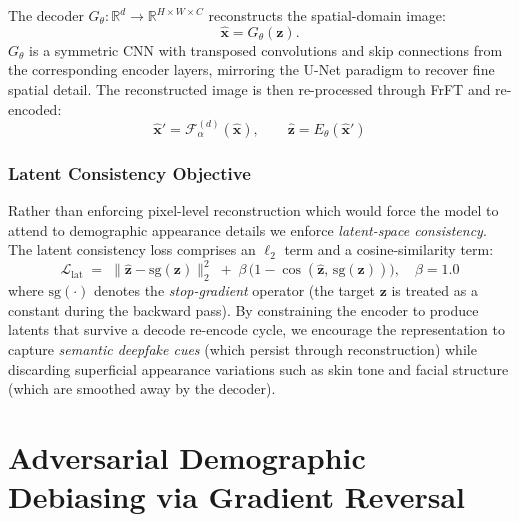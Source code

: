 The decoder $G_\theta : \mathbb{R}^d \to
\mathbb{R}^{H \times W \times C}$ reconstructs the spatial-domain
image:
\begin{equation}
  \hat{\mathbf{x}} = G_\theta(\mathbf{z}).
  \label{eq:decoder}
\end{equation}
$G_\theta$ is a symmetric CNN with transposed convolutions and skip connections from the corresponding encoder layers, mirroring the U-Net paradigm to recover fine spatial detail. The reconstructed image is then re-processed through FrFT and re-encoded:
\begin{equation}
  \hat{\mathbf{x}}' = \mathcal{F}_\alpha^{(d)}(\hat{\mathbf{x}}),
  \qquad
  \hat{\mathbf{z}} = E_\theta(\hat{\mathbf{x}}')
  \label{eq:cycle}
\end{equation}
 
\subsubsection{Latent Consistency Objective}
\label{subsec:lat_consistency}
 
Rather than enforcing pixel-level reconstruction which would force the model to attend to demographic appearance details we enforce \emph{latent-space consistency}. The latent consistency loss comprises an $\ell_2$ term and a cosine-similarity term:
\begin{equation}
  \mathcal{L}_{\mathrm{lat}}
  \;=\;
  \bigl\|\hat{\mathbf{z}} - \mathrm{sg}(\mathbf{z})\bigr\|_2^2
  \;+\;
  \beta\,\bigl(1 - \cos(\hat{\mathbf{z}},\,\mathrm{sg}(\mathbf{z}))\bigr),
  \quad \beta = 1.0
  \label{eq:lat_loss}
\end{equation}
where $\mathrm{sg}(\cdot)$ denotes the \emph{stop-gradient} operator (the target $\mathbf{z}$ is treated as a constant during the backward pass). By constraining the encoder to produce latents that survive a decode re-encode cycle, we encourage the representation to capture \emph{semantic deepfake cues} (which persist through reconstruction) while discarding superficial appearance variations such as skin tone and facial structure (which are smoothed away by the decoder).
 
\section{Adversarial Demographic Debiasing via Gradient Reversal}
\label{sec:adv_debias}
 

